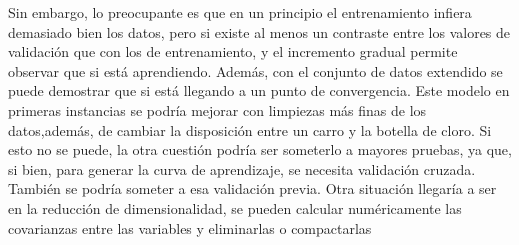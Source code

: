 \documentclass[conference]{IEEEtran}
\begin{document}
Sin embargo, lo preocupante es que en un principio el entrenamiento infiera demasiado bien los datos, pero si existe al menos un contraste entre los valores de validación que con los de entrenamiento, y el incremento gradual permite observar que si está aprendiendo. Además, con el conjunto de datos extendido se puede demostrar que si está llegando a un punto de convergencia. 
Este modelo en primeras instancias se podría mejorar con limpiezas más finas de los datos,además, de cambiar la disposición entre un carro y la botella de cloro. Si esto no se puede, la otra cuestión podría ser someterlo a mayores pruebas, ya que, si bien, para generar la curva de aprendizaje, se necesita validación cruzada. También se podría someter a esa validación previa. Otra situación llegaría a ser en la reducción de dimensionalidad, se pueden calcular numéricamente las covarianzas entre las variables y eliminarlas o compactarlas


\end{document}

